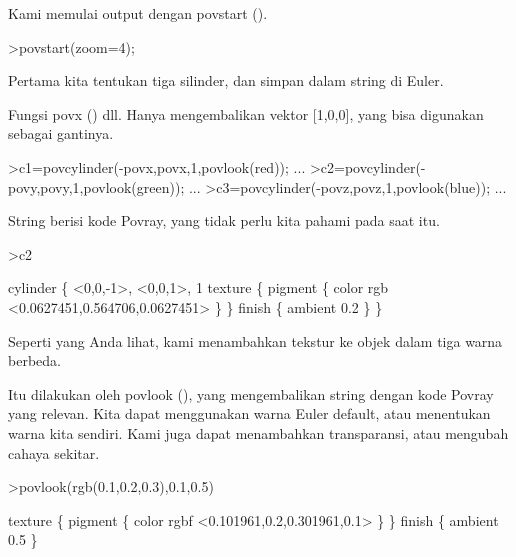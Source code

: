 \documentclass{article}
\begin{document}
\begin{eulernotebook}
\begin{eulercomment}
\begin{eulercomment}
\begin{eulercomment}
\begin{eulercomment}
\begin{eulercomment}
\begin{eulercomment}
\begin{eulercomment}
\begin{eulercomment}
\begin{eulercomment}
\begin{eulercomment}
\begin{eulercomment}
\begin{eulercomment}
\begin{eulercomment}
\begin{eulercomment}
\begin{eulercomment}
\begin{eulercomment}
\begin{eulercomment}
\begin{eulercomment}
\begin{eulercomment}
\begin{eulercomment}
\begin{eulercomment}
\begin{eulercomment}
\begin{eulercomment}
\begin{eulercomment}
\begin{eulercomment}
Kami memulai output dengan povstart ().
\end{eulercomment}
\begin{eulerprompt}
>povstart(zoom=4);
\end{eulerprompt}
\begin{eulercomment}
Pertama kita tentukan tiga silinder, dan simpan dalam string di Euler.

Fungsi povx () dll. Hanya mengembalikan vektor [1,0,0], yang bisa
digunakan sebagai gantinya.
\end{eulercomment}
\begin{eulerprompt}
>c1=povcylinder(-povx,povx,1,povlook(red)); ...
>c2=povcylinder(-povy,povy,1,povlook(green)); ...
>c3=povcylinder(-povz,povz,1,povlook(blue)); ...
\end{eulerprompt}
\begin{eulercomment}
String berisi kode Povray, yang tidak perlu kita pahami pada saat itu.
\end{eulercomment}
\begin{eulerprompt}
>c2
\end{eulerprompt}
\begin{euleroutput}
  cylinder \{ <0,0,-1>, <0,0,1>, 1
   texture \{ pigment \{ color rgb <0.0627451,0.564706,0.0627451> \}  \} 
   finish \{ ambient 0.2 \} 
   \}
\end{euleroutput}
\begin{eulercomment}
Seperti yang Anda lihat, kami menambahkan tekstur ke objek dalam tiga
warna berbeda.

Itu dilakukan oleh povlook (), yang mengembalikan string dengan kode
Povray yang relevan. Kita dapat menggunakan warna Euler default, atau
menentukan warna kita sendiri. Kami juga dapat menambahkan
transparansi, atau mengubah cahaya sekitar.
\end{eulercomment}
\begin{eulerprompt}
>povlook(rgb(0.1,0.2,0.3),0.1,0.5)
\end{eulerprompt}
\begin{euleroutput}
   texture \{ pigment \{ color rgbf <0.101961,0.2,0.301961,0.1> \}  \} 
   finish \{ ambient 0.5 \} 
  

\end{euleroutput}
\end{eulercomment}
\end{eulercomment}
\end{eulercomment}
\end{eulercomment}
\end{eulercomment}
\end{eulercomment}
\end{eulercomment}
\end{eulercomment}
\end{eulercomment}
\end{eulercomment}
\end{eulercomment}
\end{eulercomment}
\end{eulercomment}
\end{eulercomment}
\end{eulercomment}
\end{eulercomment}
\end{eulercomment}
\end{eulercomment}
\end{eulercomment}
\end{eulercomment}
\end{eulercomment}
\end{eulercomment}
\end{eulercomment}
\end{eulercomment}
\end{eulernotebook}
\end{document}
